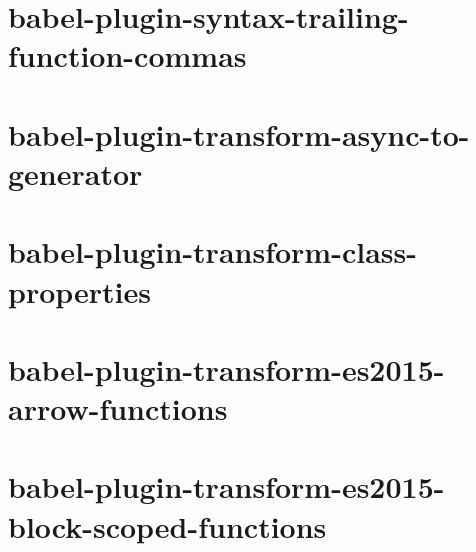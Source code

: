 \documentclass[twoside]{book}
\newcommand{\+}{\discretionary{\mbox{\scriptsize$\hookleftarrow$}}{}{}}
\begin{document}
\chapter{babel-\/plugin-\/syntax-\/trailing-\/function-\/commas}
\label{md__c_1_workspace_demo_src_main_script_node_modules_babel-plugin-syntax-trailing-function-commas__r_e_a_d_m_e}

\chapter{babel-\/plugin-\/transform-\/async-\/to-\/generator}
\label{md__c_1_workspace_demo_src_main_script_node_modules_babel-plugin-transform-async-to-generator__r_e_a_d_m_e}

\chapter{babel-\/plugin-\/transform-\/class-\/properties}
\label{md__c_1_workspace_demo_src_main_script_node_modules_babel-plugin-transform-class-properties__r_e_a_d_m_e}

\chapter{babel-\/plugin-\/transform-\/es2015-\/arrow-\/functions}
\label{md__c_1_workspace_demo_src_main_script_node_modules_babel-plugin-transform-es2015-arrow-functions__r_e_a_d_m_e}

\chapter{babel-\/plugin-\/transform-\/es2015-\/block-\/scoped-\/functions}
\label{md__c_1_workspace_demo_src_main_script_node_modules_babel-plugin-transform-es2015-block-scoped-functions__r_e_a_d_m_e}

\end{document}
